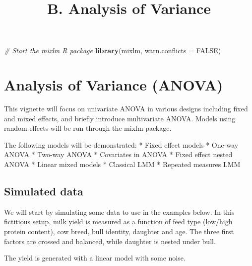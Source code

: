 \documentclass[
]{article}
\title{B. Analysis of Variance}
\author{}
\date{\vspace{-2.5em}}
\newenvironment{Shaded}{\begin{snugshade}}{\end{snugshade}}
\newcommand{\AttributeTok}[1]{\textcolor[rgb]{0.13,0.29,0.53}{#1}}
\newcommand{\CommentTok}[1]{\textcolor[rgb]{0.56,0.35,0.01}{\textit{#1}}}
\newcommand{\ConstantTok}[1]{\textcolor[rgb]{0.56,0.35,0.01}{#1}}
\newcommand{\FunctionTok}[1]{\textcolor[rgb]{0.13,0.29,0.53}{\textbf{#1}}}
\newcommand{\NormalTok}[1]{#1}
\begin{document}
\maketitle

{
\setcounter{tocdepth}{2}
\tableofcontents
}
\begin{Shaded}
\begin{Highlighting}[]
\CommentTok{\# Start the mixlm R package}
\FunctionTok{library}\NormalTok{(mixlm, }\AttributeTok{warn.conflicts =} \ConstantTok{FALSE}\NormalTok{)}
\end{Highlighting}
\end{Shaded}

\section{Analysis of Variance (ANOVA)}\label{analysis-of-variance-anova}

This vignette will focus on univariate ANOVA in various designs
including fixed and mixed effects, and briefly introduce multivariate
ANOVA. Models using random effects will be run through the mixlm
package.

The following models will be demonstrated: * Fixed effect models *
One-way ANOVA * Two-way ANOVA * Covariates in ANOVA * Fixed effect
nested ANOVA * Linear mixed models * Classical LMM * Repeated measures
LMM

\subsection{Simulated data}\label{simulated-data}

We will start by simulating some data to use in the examples below. In
this fictitious setup, milk yield is measured as a function of feed type
(low/high protein content), cow breed, bull identity, daughter and age.
The three first factors are crossed and balanced, while daughter is
nested under bull.

The yield is generated with a linear model with some noise.
\end{document}
